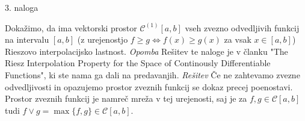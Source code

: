 \documentclass[a4paper, 12pt]{article}
\begin{document}
\begin{flushleft}
3. naloga
\end{flushleft}
Dokažimo, da ima vektorski prostor $\mathcal{C}^{(1)} [a,b]$ vseh zvezno odvedljivih funkcij na intervalu $[a,b]$ (z urejenostjo $f\ge g \Leftrightarrow f(x) \ge g(x)$ za vsak $x\in [a,b]$) Rieszovo interpolacijsko lastnost.
\newline
\emph{Opomba}
\newline
Rešitev te naloge je v članku "The Riesz Interpolation Property for the Space of Continously Differentiable Functions", ki ste nama ga dali na predavanjih. 
\newline
\emph{Rešitev}
\newline
Če ne zahtevamo zvezne odvedljivosti in opazujemo prostor zveznih funkcij se dokaz precej poenostavi. Prostor zveznih funkcij je namreč mreža v tej urejenosti, saj je za $f,g\in \mathcal{C}[a,b]$ tudi $f\lor g = \max\{f,g\} \in \mathcal{C}[a,b] $.
\end{document}
